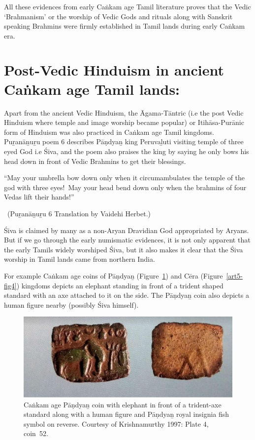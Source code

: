 All these evidences from early Caṅkam age Tamil literature proves that the Vedic ‘Brahmanism’ or the worship of Vedic Gods and rituals along with Sanskrit speaking Brahmins were firmly established in Tamil lands during early Caṅkam era.


\section*{Post-Vedic Hinduism in ancient Caṅkam age Tamil lands:}

Apart from the ancient Vedic Hinduism, the Āgama-Tāntric (i.e the post Vedic Hinduism where temple and image worship became popular) or Itihāsa-Purānic form of Hinduism was also practiced in Caṅkam age Tamil kingdoms. Puṟanāṉuṟu poem 6 describes Pāṇdyaṉ king Peruvaḻuti visiting temple of three eyed God i.e Śiva, and the poem also praises the king by saying he only bows his head down in front of Vedic Brahmins to get their blessings.

\begin{myquote}
“May your umbrella bow down only when it circumambulates the temple of the god with three eyes! May your head bend down only when the brahmins of four Vedas lift their hands!”

~\hfill (Puṟanāṉuṟu 6 Translation by Vaidehi Herbet.)
\end{myquote}

Śiva is claimed by many as a non-Aryan Dravidian God appropriated by Aryans. But if we go through the early numismatic evidences, it is not only apparent that the early Tamils widely worshiped Śiva, but it also makes it clear that the Śiva worship in Tamil lands came from northern India.

For example Caṅkam age coins of Pāṇdyaṉ (Figure~\ref{art5-fig3}) and Cēra (Figure~\ref{art5-fig4}) kingdoms depicts an elephant standing in front of a trident shaped standard with an axe attached to it on the side. The Pāṇdyaṉ coin also depicts a human figure nearby (possibly Śiva himself).

\begin{figure}[H]
\includegraphics[scale=1.1]{"images/article-05/art05-fig03.jpg"}
\caption{Caṅkam age Pāṇdyaṉ coin with elephant in front of a trident-axe standard along with a human figure and Pāṇdyaṉ royal insignia fish symbol on reverse. Courtesy of Krishnamurthy 1997: Plate 4, coin~52.}\label{art5-fig3}
\end{figure}


